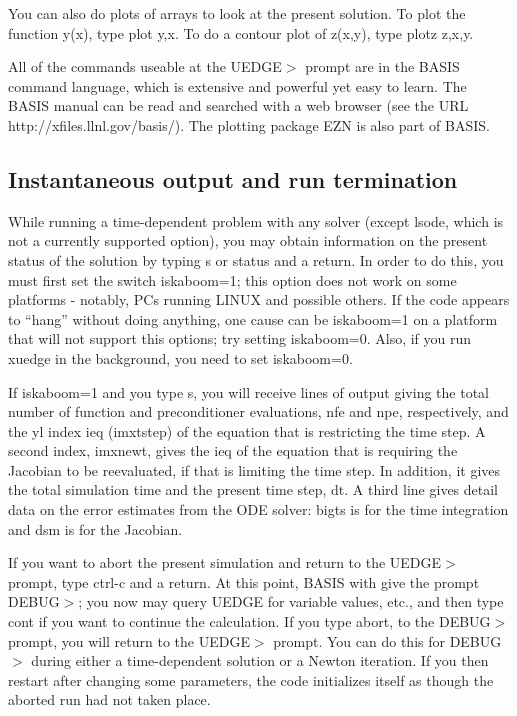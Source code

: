 \documentclass [12pt]{article}
\begin{document}
You can also do plots of arrays to look at the present solution.  To plot the
function y(x), type {\sf plot y,x}.  To do a contour plot of z(x,y), type {\sf
  plotz z,x,y}.  

All of the commands useable at the {\sf UEDGE$>$} prompt are in the {\sf
  BASIS} command language, which is extensive and powerful yet easy to learn.
The {\sf BASIS} manual can be read and searched with a web browser (see the
URL {\sf http://xfiles.llnl.gov/basis/}).  The plotting package {\sf EZN} is
  also part of {\sf BASIS}.

\subsection{Instantaneous output and run termination}

While running a time-dependent problem with any solver (except {\sf lsode},
which is not a currently supported option), you may obtain information on the
present status of the solution by typing {\sf s} or {\sf status} and a return.
In order to do this, you must first set the switch {\sf iskaboom=1}; this
option does not work on some platforms - notably, PCs running LINUX and
possible others.  If the code appears to ``hang'' without doing anything, one
cause can be {\sf iskaboom=1} on a platform that will not support this
options; try setting {\sf iskaboom=0}.  Also, if you run {\sf xuedge} in the
background, you need to set {\sf iskaboom=0}.  

If {\sf iskaboom=1} and you type {\sf s}, you will receive lines of output
giving the total number of function and preconditioner evaluations, nfe and
npe, respectively, and the {\sf yl} index {\sf ieq} (imxtstep) of the equation
that is restricting the time step.  A second index, imxnewt, gives the {\sf
  ieq} of the equation that is requiring the Jacobian to be reevaluated, if
that is limiting the time step.  In addition, it gives the total simulation
time and the present time step, {\sf dt}.  A third line gives detail data on
the error estimates from the ODE solver: {\sf bigts} is for the time
integration and {\sf dsm} is for the Jacobian.

If you want to abort the present simulation and return to the {\sf UEDGE$>$}
prompt, type ctrl-c and a return. At this point, {\sf BASIS} with give the
prompt DEBUG$>$; you now may query {\sf UEDGE} for variable values, etc., and
then type {\sf cont} if you want to continue the calculation.  If you type
{\sf abort}, to the DEBUG$>$ prompt, you will return to the {\sf UEDGE$>$}
prompt.  You can do this for DEBUG$>$ during either a time-dependent solution
or a Newton iteration.  If you then restart after changing some parameters,
the code initializes itself as though the aborted run had not taken place.
\end{document}
